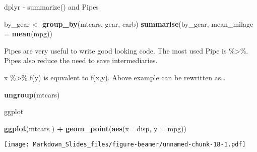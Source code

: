 \documentclass[ignorenonframetext,]{beamer}
\newenvironment{Shaded}{\begin{snugshade}}{\end{snugshade}}
\newcommand{\DataTypeTok}[1]{\textcolor[rgb]{0.13,0.29,0.53}{#1}}
\newcommand{\KeywordTok}[1]{\textcolor[rgb]{0.13,0.29,0.53}{\textbf{#1}}}
\newcommand{\NormalTok}[1]{#1}
\newcommand{\OperatorTok}[1]{\textcolor[rgb]{0.81,0.36,0.00}{\textbf{#1}}}
\newcommand{\StringTok}[1]{\textcolor[rgb]{0.31,0.60,0.02}{#1}}
\begin{document}
\begin{frame}[fragile]{dplyr - summarize() and Pipes}
\protect\hypertarget{dplyr---summarize-and-pipes}{}

\begin{Shaded}
\begin{Highlighting}[]
\NormalTok{by_gear <-}\StringTok{ }\KeywordTok{group_by}\NormalTok{(mtcars, gear, carb)}
\KeywordTok{summarise}\NormalTok{(by_gear, }\DataTypeTok{mean_milage =} \KeywordTok{mean}\NormalTok{(mpg))}
\end{Highlighting}
\end{Shaded}

Pipes are very useful to write good looking code. The most used Pipe is
\%\textgreater{}\%. Pipes also reduce the need to save intermediaries.

x \%\textgreater{}\% f(y) is equvalent to f(x,y). Above example can be
rewritten as\ldots{}

\begin{Shaded}
\end{Shaded}

\begin{Shaded}
\begin{Highlighting}[]
\KeywordTok{ungroup}\NormalTok{(mtcars)}
\end{Highlighting}
\end{Shaded}

\end{frame}

\begin{frame}[fragile]{ggplot}
\protect\hypertarget{ggplot}{}

\begin{Shaded}
\begin{Highlighting}[]
\KeywordTok{ggplot}\NormalTok{(mtcars ) }\OperatorTok{+}\StringTok{ }\KeywordTok{geom_point}\NormalTok{(}\KeywordTok{aes}\NormalTok{(}\DataTypeTok{x=}\NormalTok{ disp, }\DataTypeTok{y =}\NormalTok{ mpg))}
\end{Highlighting}
\end{Shaded}

\texttt{[image: Markdown\_Slides\_files/figure-beamer/unnamed-chunk-18-1.pdf]}

\end{frame}
\end{document}

